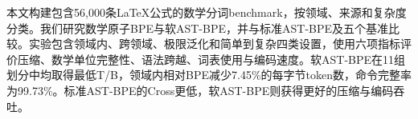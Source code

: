本文构建包含56,000条LaTeX公式的数学分词benchmark，按领域、来源和复杂度分类。我们研究数学原子BPE与软AST-BPE，并与标准AST-BPE及五个基准比较。实验包含领域内、跨领域、极限泛化和简单到复杂四类设置，使用六项指标评价压缩、数学单位完整性、语法跨越、词表使用与编码速度。软AST-BPE在11组划分中均取得最低T/B，领域内相对BPE减少7.45\%的每字节token数，命令完整率为99.73\%。标准AST-BPE的Cross更低，软AST-BPE则获得更好的压缩与编码吞吐。

